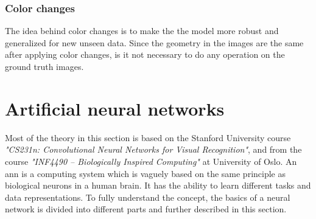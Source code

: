 \documentclass[USenglish]{ifimaster}  %
\begin{document}
\subsubsection{Color changes}
The idea behind color changes is to make the the model more robust and generalized for new unseen data. Since the geometry in the images are the same after applying color changes, is it not necessary to do any operation on the ground truth images.
\section{Artificial neural networks}
Most of the theory in this section is based on the Stanford University course \textit{"CS231n: Convolutional Neural Networks for Visual Recognition"}\cite{website:cs231n}, and from the course \textit{"INF4490 – Biologically Inspired Computing"}\cite{website:inf_4490_slp}\cite{website:inf_4490_mlp} at University of Oslo.
\newline
\newline
An \ac{ann} is a computing system which is vaguely based on the same principle as biological neurons in a human brain. It has the ability to learn different tasks and data representations. To fully understand the concept, the basics of a neural network is divided into different parts and further described in this section.
\newline
\newline
\end{document}
